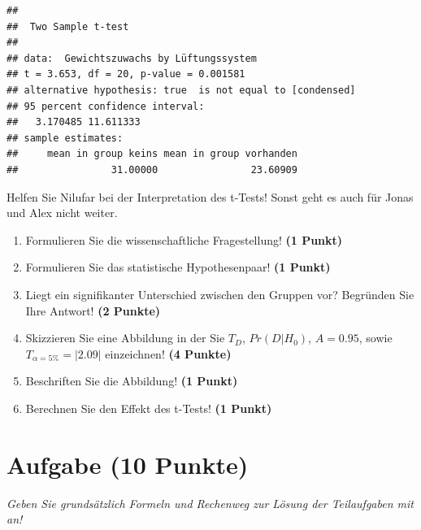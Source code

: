 \documentclass[a4paper, 9pt]{scrartcl}\usepackage[]{graphicx}\usepackage[]{xcolor}
\makeatletter
\newenvironment{kframe}{%
 \def\at@end@of@kframe{}%
 \ifinner\ifhmode%
  \def\at@end@of@kframe{\end{minipage}}%
  \begin{minipage}{\columnwidth}%
 \fi\fi%
 \def\FrameCommand##1{\hskip\@totalleftmargin \hskip-\fboxsep
 \colorbox{shadecolor}{##1}\hskip-\fboxsep
     \hskip-\linewidth \hskip-\@totalleftmargin \hskip\columnwidth}%
 \MakeFramed {\advance\hsize-\width
   \@totalleftmargin\z@ \linewidth\hsize
   \@setminipage}}%
 {\par\unskip\endMakeFramed%
 \at@end@of@kframe}
\newenvironment{knitrout}{}{} %
\makeatother
\begin{document}
\begin{knitrout}
\color{fgcolor}\begin{kframe}
\begin{verbatim}
## 
## 	Two Sample t-test
## 
## data:  Gewichtszuwachs by Lüftungssystem
## t = 3.653, df = 20, p-value = 0.001581
## alternative hypothesis: true  is not equal to [condensed]
## 95 percent confidence interval:
##   3.170485 11.611333
## sample estimates:
##     mean in group keins mean in group vorhanden 
##                31.00000                23.60909
\end{verbatim}
\end{kframe}
\end{knitrout}

Helfen Sie Nilufar bei der Interpretation des t-Tests! Sonst geht es auch für Jonas und Alex nicht weiter.
  
\begin{enumerate}
  \item Formulieren Sie die wissenschaftliche Fragestellung! \textbf{(1 Punkt)}
  \item Formulieren Sie das statistische Hypothesenpaar! \textbf{(1 Punkt)}
\item Liegt ein signifikanter Unterschied zwischen den Gruppen vor? Begründen Sie Ihre Antwort! \textbf{(2 Punkte)}
\item Skizzieren Sie eine Abbildung in der Sie $T_{D}$, $Pr(D|H_0)$, $A=0.95$, sowie $T_{\alpha=5\%} = |2.09|$ einzeichnen! \textbf{(4 Punkte)}
\item Beschriften Sie die Abbildung! \textbf{(1 Punkt)}  
\item Berechnen Sie den Effekt des t-Tests! \textbf{(1 Punkt)}
\end{enumerate} 
\clearpage

\section{Aufgabe \hfill (10 Punkte)}

\textit{Geben Sie grundsätzlich Formeln und Rechenweg zur Lösung der Teilaufgaben mit an!} \\[1Ex]
 
\end{document}
